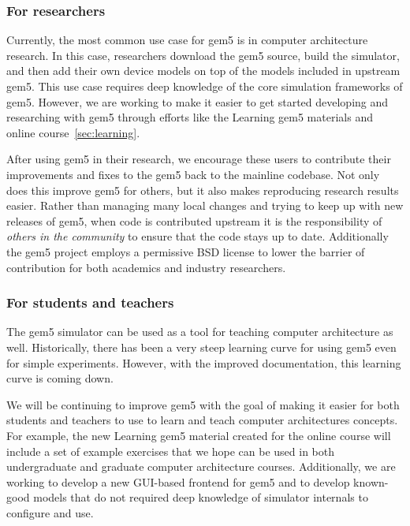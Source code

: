 \subsubsection{For researchers}

Currently, the most common use case for gem5 is in computer architecture research.
In this case, researchers download the gem5 source, build the simulator, and then add their own device models on top of the models included in upstream gem5.
This use case requires deep knowledge of the core simulation frameworks of gem5.
However, we are working to make it easier to get started developing and researching with gem5 through efforts like the Learning gem5 materials and online course~\ref{sec:learning}.

After using gem5 in their research, we encourage these users to contribute their improvements and fixes to the gem5 back to the mainline codebase.
Not only does this improve gem5 for others, but it also makes reproducing research results easier.
Rather than managing many local changes and trying to keep up with new releases of gem5, when code is contributed upstream it is the responsibility of \emph{others in the community} to ensure that the code stays up to date.
Additionally the gem5 project employs a permissive BSD license to lower the barrier of contribution for both academics and industry researchers.

\subsubsection{For students and teachers}

The gem5 simulator can be used as a tool for teaching computer architecture as well.
Historically, there has been a very steep learning curve for using gem5 even for simple experiments.
However, with the improved documentation, this learning curve is coming down.

We will be continuing to improve gem5 with the goal of making it easier for both students and teachers to use to learn and teach computer architectures concepts.
For example, the new Learning gem5 material created for the online course will include a set of example exercises that we hope can be used in both undergraduate and graduate computer architecture courses.
Additionally, we are working to develop a new GUI-based frontend for gem5 and to develop known-good models that do not required deep knowledge of simulator internals to configure and use.
